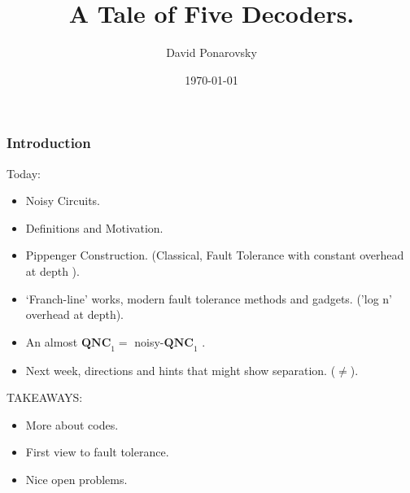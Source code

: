 \documentclass{beamer}
\newcommand*{\QNCon}{ \mathbf{QNC}_{1} }
\newcommand*{\noiseQNCon}{ noisy-$\QNCon$ }
\begin{document}
 

\newcommand*{\Tr}{\textbf{Tr }}


\begin{frame}
  \title{A Tale of Five Decoders.}
    \author{David Ponarovsky}
    \date{\today}
    \titlepage
\end{frame}


\begin{frame}

\frametitle{Introduction}
\begin{block}{Today:}
\begin{itemize}
  \item Noisy Circuits.
  \item  Definitions and Motivation.
  \item  Pippenger Construction. (Classical, Fault Tolerance with constant overhead at depth ).
  \item `Franch-line' works, modern fault tolerance methods and gadgets. ('log n' overhead at depth).  
  \item An almost  $\QNCon =$ \noiseQNCon. 
  \item Next week, directions and hints that might show separation. ($\neq$).
\end{itemize}
\end{block}
\begin{block}{TAKEAWAYS:}
\begin{itemize}
  \item More about codes.
  \item  First view to fault tolerance.  
  \item Nice open problems. 
\end{itemize}
\end{block}
\end{frame}




\end{document}
